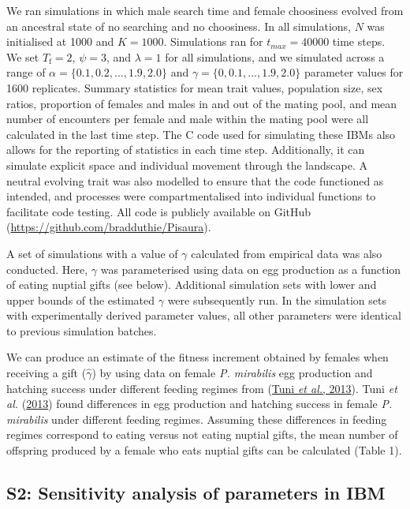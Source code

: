 \documentclass[
]{article}
\begin{document}
We ran simulations in which male search time and female choosiness
evolved from an ancestral state of no searching and no choosiness. In
all simulations, \(N\) was initialised at 1000 and \(K = 1000\).
Simulations ran for \(t_{max} = 40000\) time steps. We set
\(T_{\mathrm{f}} = 2\), \(\psi = 3\), and \(\lambda = 1\) for all
simulations, and we simulated across a range of
\(\alpha = \{0.1, 0.2, ..., 1.9, 2.0\}\) and
\(\gamma = \{0, 0.1, ..., 1.9, 2.0\}\) parameter values for 1600
replicates. Summary statistics for mean trait values, population size,
sex ratios, proportion of females and males in and out of the mating
pool, and mean number of encounters per female and male within the
mating pool were all calculated in the last time step. The C code used
for simulating these IBMs also allows for the reporting of statistics in
each time step. Additionally, it can simulate explicit space and
individual movement through the landscape. A neutral evolving trait was
also modelled to ensure that the code functioned as intended, and
processes were compartmentalised into individual functions to facilitate
code testing. All code is publicly available on GitHub
(\url{https://github.com/bradduthie/Pisaura}).

A set of simulations with a value of \(\gamma\) calculated from
empirical data was also conducted. Here, \(\gamma\) was parameterised
using data on egg production as a function of eating nuptial gifts (see
below). Additional simulation sets with lower and upper bounds of the
estimated \(\gamma\) were subsequently run. In the simulation sets with
experimentally derived parameter values, all other parameters were
identical to previous simulation batches.

We can produce an estimate of the fitness increment obtained by females
when receiving a gift (\(\hat{\gamma}\)) by using data on female
\emph{P. mirabilis} egg production and hatching success under different
feeding regimes from (\protect\hyperlink{ref-Tuni2013a}{Tuni \emph{et
al.}, 2013}). Tuni \emph{et al.}
(\protect\hyperlink{ref-Tuni2013a}{2013}) found differences in egg
production and hatching success in female \emph{P. mirabilis} under
different feeding regimes. Assuming these differences in feeding regimes
correspond to eating versus not eating nuptial gifts, the mean number of
offspring produced by a female who eats nuptial gifts can be calculated
(Table 1).

\hypertarget{s2-sensitivity-analysis-of-parameters-in-ibm}{%
\subsection{S2: Sensitivity analysis of parameters in
IBM}\label{s2-sensitivity-analysis-of-parameters-in-ibm}}
\end{document}
